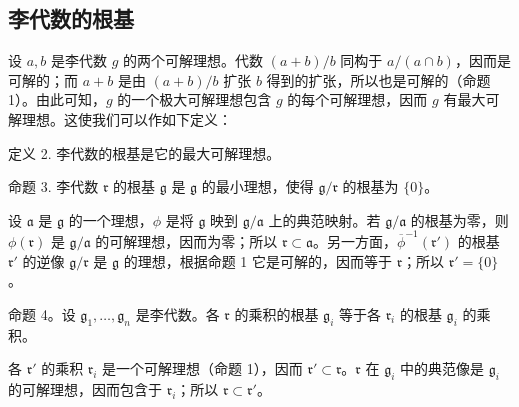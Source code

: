 \subsection{李代数的根基}

设 \(a, b\) 是李代数 \(g\) 的两个可解理想。代数 \((a + b)/b\) 同构于 \(a/(a \cap b)\)，因而是可解的；而 \(a + b\) 是由 \((a + b)/b\) 扩张 \(b\) 得到的扩张，所以也是可解的（命题 1）。由此可知，\(g\) 的一个极大可解理想包含 \(g\) 的每个可解理想，因而 \(g\) 有最大可解理想。这使我们可以作如下定义：

定义 2. 李代数的根基是它的最大可解理想。

命题 3. 李代数 \(\mathfrak{r}\) 的根基 \(\mathfrak{g}\) 是 \(\mathfrak{g}\) 的最小理想，使得 \(\mathfrak{g} / \mathfrak{r}\) 的根基为 \(\{0\}\)。

设 \(\mathfrak{a}\) 是 \(\mathfrak{g}\) 的一个理想，\(\phi\) 是将 \(\mathfrak{g}\) 映到 \(\mathfrak{g}/\mathfrak{a}\) 上的典范映射。若 \(\mathfrak{g}/\mathfrak{a}\) 的根基为零，则 \(\phi(\mathfrak{r})\) 是 \(\mathfrak{g}/\mathfrak{a}\) 的可解理想，因而为零；所以 \(\mathfrak{r} \subset \mathfrak{a}\)。另一方面，\(\overline{\phi}^{-1}(\mathfrak{r}')\) 的根基 \(\mathfrak{r}'\) 的逆像 \(\mathfrak{g}/\mathfrak{r}\) 是 \(\mathfrak{g}\) 的理想，根据命题 1 它是可解的，因而等于 \(\mathfrak{r}\)；所以 \(\mathfrak{r}' = \{0\}\)。

命题 4。设 \(\mathfrak{g}_1, \ldots, \mathfrak{g}_n\) 是李代数。各 \(\mathfrak{r}\) 的乘积的根基 \(\mathfrak{g}_i\) 等于各 \(\mathfrak{r}_i\) 的根基 \(\mathfrak{g}_i\) 的乘积。

各 \(\mathfrak{r}'\) 的乘积 \(\mathfrak{r}_i\) 是一个可解理想（命题 1），因而 \(\mathfrak{r}' \subset \mathfrak{r}\)。\(\mathfrak{r}\) 在 \(\mathfrak{g}_i\) 中的典范像是 \(\mathfrak{g}_i\) 的可解理想，因而包含于 \(\mathfrak{r}_i\)；所以 \(\mathfrak{r} \subset \mathfrak{r}'\)。

